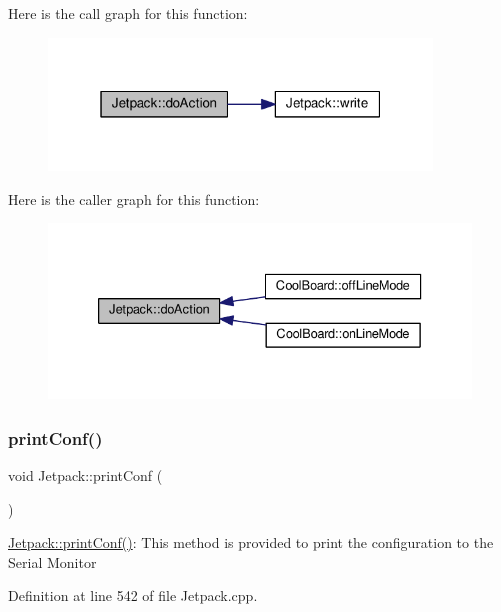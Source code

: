 Here is the call graph for this function\+:
\nopagebreak
\begin{figure}[H]
\begin{center}
\leavevmode
\includegraphics[width=289pt]{classJetpack_a9e703197093094b963f9ad57817495b8_cgraph}
\end{center}
\end{figure}
Here is the caller graph for this function\+:
\nopagebreak
\begin{figure}[H]
\begin{center}
\leavevmode
\includegraphics[width=333pt]{classJetpack_a9e703197093094b963f9ad57817495b8_icgraph}
\end{center}
\end{figure}
\mbox{\label{classJetpack_ac54a7bb4f9166bee32052253d9b1d306}} 
\subsubsection{\texorpdfstring{print\+Conf()}{printConf()}}
{\footnotesize\ttfamily void Jetpack\+::print\+Conf (\begin{DoxyParamCaption}{ }\end{DoxyParamCaption})}

\hyperlink{classJetpack_ac54a7bb4f9166bee32052253d9b1d306}{Jetpack\+::print\+Conf()}\+: This method is provided to print the configuration to the Serial Monitor 

Definition at line 542 of file Jetpack.\+cpp.



